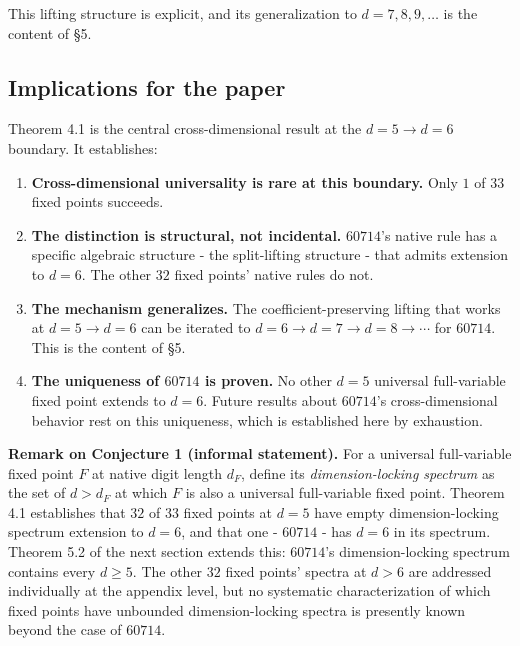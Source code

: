 \documentclass[11pt,letterpaper]{article}
\providecommand{\tightlist}{%
  \setlength{\itemsep}{0pt}\setlength{\parskip}{0pt}}
\theoremstyle{paperstyle}
\theoremstyle{paperstyledef}
\theoremstyle{paperstylerem}
\begin{document}
This lifting structure is explicit, and its generalization to
\(d = 7, 8, 9, \ldots\) is the content of §5.

\hypertarget{implications-for-the-paper}{%
\subsection{Implications for the paper}\label{implications-for-the-paper}}

Theorem 4.1 is the central cross-dimensional result at the
\(d = 5 \to d = 6\) boundary. It establishes:

\begin{enumerate}
\def\labelenumi{\arabic{enumi}.}
\tightlist
\item
  \textbf{Cross-dimensional universality is rare at this boundary.} Only
  \(1\) of \(33\) fixed points succeeds.
\item
  \textbf{The distinction is structural, not incidental.} \(60714\)'s
  native rule has a specific algebraic structure - the split-lifting
  structure - that admits extension to \(d = 6\). The other \(32\)
  fixed points' native rules do not.
\item
  \textbf{The mechanism generalizes.} The coefficient-preserving lifting
  that works at \(d = 5 \to d = 6\) can be iterated to
  \(d = 6 \to d = 7 \to d = 8 \to \cdots\) for \(60714\). This is the
  content of §5.
\item
  \textbf{The uniqueness of \(60714\) is proven.} No other \(d = 5\)
  universal full-variable fixed point extends to \(d = 6\). Future
  results about \(60714\)'s cross-dimensional behavior rest on this
  uniqueness, which is established here by exhaustion.
\end{enumerate}

\textbf{Remark on Conjecture 1 (informal statement).} For a universal
full-variable fixed point \(F\) at native digit length \(d_F\), define
its \emph{dimension-locking spectrum} as the set of \(d > d_F\) at which
\(F\) is also a universal full-variable fixed point. Theorem 4.1
establishes that \(32\) of \(33\) fixed points at \(d = 5\) have empty
dimension-locking spectrum extension to \(d = 6\), and that one -
\(60714\) - has \(d = 6\) in its spectrum. Theorem 5.2 of the next
section extends this: \(60714\)'s dimension-locking spectrum contains
every \(d \geq 5\). The other \(32\) fixed points' spectra at \(d > 6\)
are addressed individually at the appendix level, but no systematic
characterization of which fixed points have unbounded dimension-locking
spectra is presently known beyond the case of \(60714\).
\end{document}
